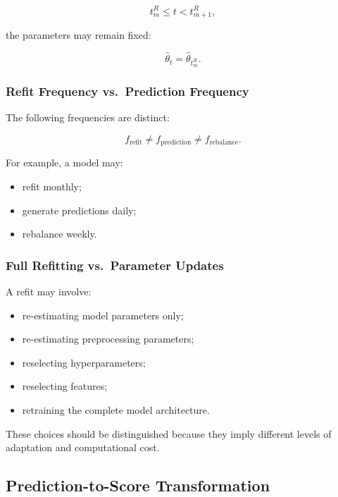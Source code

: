 \documentclass[11pt,a4paper]{article}
\begin{document}
\begin{equation}
t_m^{R}
\leq
t
<
t_{m+1}^{R},
\end{equation}

the parameters may remain fixed:

\begin{equation}
\boxed{
\widehat{\theta}_t
=
\widehat{\theta}_{t_m^{R}}.
}
\end{equation}


\subsubsection{Refit Frequency vs.\ Prediction Frequency}

The following frequencies are distinct:

\begin{equation}
\boxed{
f_{\mathrm{refit}}
\neq
f_{\mathrm{prediction}}
\neq
f_{\mathrm{rebalance}}.
}
\end{equation}

For example, a model may:

\begin{itemize}
    \item refit monthly;
    \item generate predictions daily;
    \item rebalance weekly.
\end{itemize}


\subsubsection{Full Refitting vs.\ Parameter Updates}

A refit may involve:

\begin{itemize}
    \item re-estimating model parameters only;
    \item re-estimating preprocessing parameters;
    \item reselecting hyperparameters;
    \item reselecting features;
    \item retraining the complete model architecture.
\end{itemize}

These choices should be distinguished because they imply different levels of
adaptation and computational cost.


\subsection{Prediction-to-Score Transformation}
\label{subsec:prediction_to_score}
\end{document}
